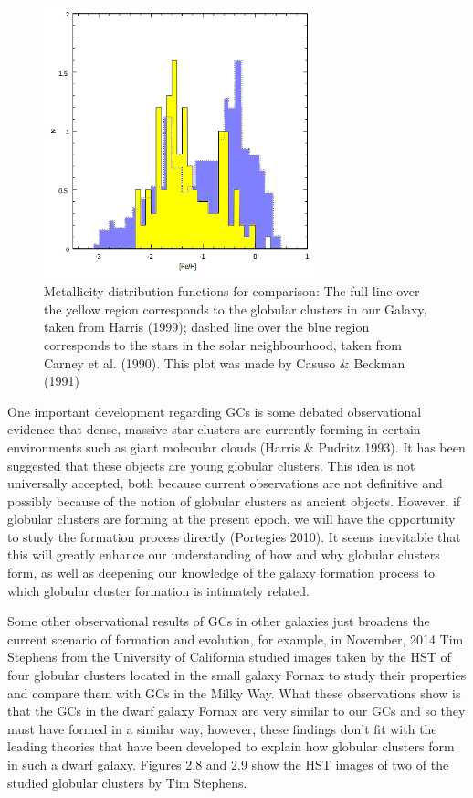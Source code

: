 \begin{figure}[H]
\centering
\includegraphics[width=8cm]{images/metal.png}
\caption[Metallicity of GCs compared to stars in the solar neighbourhood]{Metallicity distribution functions for comparison: The full line  over the yellow region corresponds to the globular clusters in our Galaxy, taken from Harris (1999); dashed line over the blue region corresponds to the stars in the solar neighbourhood, taken from Carney et al. (1990). This plot was made by Casuso \& Beckman (1991)}
\end{figure}

One important development regarding GCs is some debated observational evidence that dense, massive star clusters are currently forming in certain environments such as giant molecular clouds (Harris \& Pudritz 1993). It has been suggested that these objects are young globular clusters. This idea is not universally accepted, both because current observations are not definitive and possibly because of the notion of globular clusters as ancient objects. However, if globular clusters are forming at the present epoch, we will have the opportunity to study the formation process directly (Portegies 2010). It seems inevitable that this will greatly enhance our understanding of how and why globular clusters form, as well as deepening our knowledge of the galaxy formation process to which globular cluster formation is intimately related.

Some other observational results of GCs in other galaxies just broadens the current scenario of formation and evolution, for example, in November, 2014 Tim Stephens from the University of California studied images taken by the HST of four globular clusters located in the small galaxy Fornax to study their properties and compare them with GCs in the Milky Way. What these observations show is that the GCs in the dwarf galaxy Fornax are very similar to our GCs and so they must have formed in a similar way, however, these findings don't fit with the leading theories that have been developed to explain how globular clusters form in such a dwarf galaxy. Figures 2.8 and 2.9 show the HST images of two of the studied globular clusters by Tim Stephens.   

